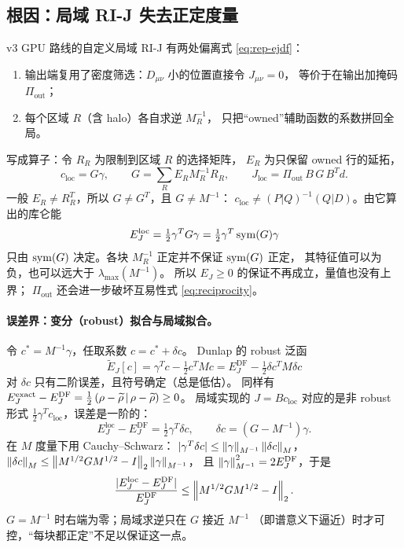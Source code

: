 \subsection{根因：局域 RI-J 失去正定度量}
\label{sec:repair-root}
v3 GPU 路线的自定义局域 RI-J 有两处偏离式 \eqref{eq:rep-ejdf}：
\begin{enumerate}
\item 输出端复用了密度筛选：\(D_{\mu\nu}\) 小的位置直接令 \(J_{\mu\nu}=0\)，
等价于在输出加掩码 \(\Pi_{\mathrm{out}}\)；
\item 每个区域 \(R\)（含 halo）各自求逆 \(M_R^{-1}\)，
只把“owned”辅助函数的系数拼回全局。
\end{enumerate}
写成算子：令 \(R_R\) 为限制到区域 \(R\) 的选择矩阵，
\(E_R\) 为只保留 owned 行的延拓，
\begin{equation}
c_{\mathrm{loc}}=G\gamma,\qquad
G=\sum_RE_RM_R^{-1}R_R,\qquad
J_{\mathrm{loc}}=\Pi_{\mathrm{out}}\,B\,G\,B^Td .
\label{eq:rep-gloc}
\end{equation}
一般 \(E_R\neq R_R^T\)，所以 \(G\neq G^T\)，且 \(G\neq M^{-1}\)：
\(c_{\mathrm{loc}}\neq(P|Q)^{-1}(Q|D)\)。由它算出的库仑能
\begin{equation}
E_J^{\mathrm{loc}}=\tfrac12\gamma^TG\gamma
=\tfrac12\gamma^T\operatorname{sym}(G)\gamma
\end{equation}
只由 \(\operatorname{sym}(G)\) 决定。各块 \(M_R^{-1}\) 正定并不保证 \(\operatorname{sym}(G)\) 正定，
其特征值可以为负，也可以远大于 \(\lambda_{\max}(M^{-1})\)。
所以 \(E_J\geq0\) 的保证不再成立，量值也没有上界；
\(\Pi_{\mathrm{out}}\) 还会进一步破坏互易性式 \eqref{eq:reciprocity}。

\paragraph{误差界：变分（robust）拟合与局域拟合。}
令 \(c^\ast=M^{-1}\gamma\)，任取系数 \(c=c^\ast+\delta c\)。
Dunlap 的 robust 泛函
\begin{equation}
\widetilde E_J[c]=\gamma^Tc-\tfrac12c^TMc
=E_J^{\mathrm{DF}}-\tfrac12\delta c^TM\delta c
\label{eq:rep-robust}
\end{equation}
对 \(\delta c\) 只有二阶误差，且符号确定（总是低估）。
同样有 \(E_J^{\mathrm{exact}}-E_J^{\mathrm{DF}}
=\frac12\left(\rho-\widetilde\rho\,\middle|\,\rho-\widetilde\rho\right)\geq0\)。
局域实现的 \(J=Bc_{\mathrm{loc}}\) 对应的是非 robust 形式
\(\frac12\gamma^Tc_{\mathrm{loc}}\)，误差是一阶的：
\begin{equation}
E_J^{\mathrm{loc}}-E_J^{\mathrm{DF}}=\tfrac12\gamma^T\delta c,
\qquad \delta c=(G-M^{-1})\gamma .
\end{equation}
在 \(M\) 度量下用 Cauchy--Schwarz：
\(|\gamma^T\delta c|\leq\left\lVert \gamma\right\rVert_{M^{-1}}\left\lVert \delta c\right\rVert_M\)，
\(\left\lVert \delta c\right\rVert_M\leq\left\lVert M^{1/2}GM^{1/2}-I\right\rVert_2\left\lVert \gamma\right\rVert_{M^{-1}}\)，
且 \(\left\lVert \gamma\right\rVert_{M^{-1}}^2=2E_J^{\mathrm{DF}}\)，于是
\begin{equation}
\frac{|E_J^{\mathrm{loc}}-E_J^{\mathrm{DF}}|}{E_J^{\mathrm{DF}}}
\leq\left\lVert M^{1/2}GM^{1/2}-I\right\rVert_2 .
\label{eq:rep-bound}
\end{equation}
\(G=M^{-1}\) 时右端为零；局域求逆只在 \(G\) 接近 \(M^{-1}\)
（即谱意义下逼近）时才可控，“每块都正定”不足以保证这一点。

